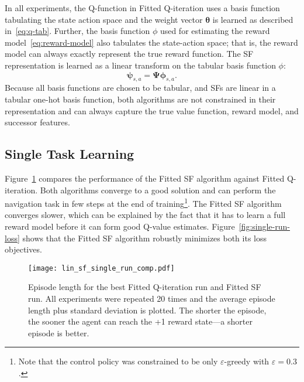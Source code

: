 \documentclass{article}
\begin{document}
In all experiments, the Q-function in Fitted Q-iteration uses a basis function tabulating the state action space and the weight vector $\pmb{\theta}$ is learned as described in~\eqref{eq:q-tab}.
Further, the basis function $\phi$ used for estimating the reward model~\eqref{eq:reward-model} also tabulates the state-action space; that is, the reward model can always exactly represent the true reward function.
The SF representation is learned as a linear transform on the tabular basis function $\phi$:
\begin{equation}
\pmb{\psi}_{s,a} = \pmb{\Psi} \pmb{\phi}_{s,a}.
\end{equation}
Because all basis functions are chosen to be tabular, and SFs are linear in a tabular one-hot basis function, both algorithms are not constrained in their representation and can always capture the true value function, reward model, and successor features.

\subsection{Single Task Learning}

Figure~\ref{fig:single-run-comp} compares the performance of the Fitted SF algorithm against Fitted Q-iteration.
Both algorithms converge to a good solution and can perform the navigation task in few steps at the end of training\footnote{Note that the control policy was constrained to be only $\varepsilon$-greedy with $\varepsilon=0.3$.}.
The Fitted SF algorithm converges slower, which can be explained by the fact that it has to learn a full reward model before it can form good Q-value estimates.
Figure~\ref{fig:single-run-loss} shows that the Fitted SF algorithm robustly minimizes both its loss objectives.

\begin{figure}
\centering

\texttt{[image: lin\_sf\_single\_run\_comp.pdf]}
\vspace{-.9cm}
\caption{Episode length for the best Fitted Q-iteration run and Fitted SF run. All experiments were repeated 20 times and the average episode length plus standard deviation is plotted. The shorter the episode, the sooner the agent can reach the +1 reward state---a shorter episode is better.}
\label{fig:single-run-comp}
\end{figure}
\end{document}
